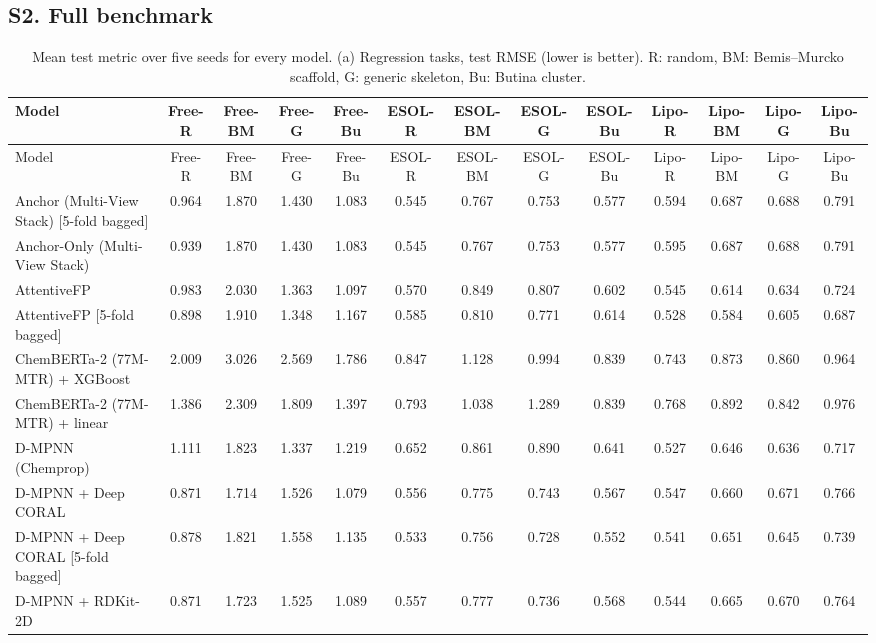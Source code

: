 \documentclass[11pt]{article}
\begin{document}
\begin{landscape}
\section*{S2. Full benchmark}{\scriptsize\setlength{\tabcolsep}{3pt}
\begin{longtable}{lcccccccccccc}
\caption{Mean test metric over five seeds for every model. (a) Regression tasks, test RMSE (lower is better). R: random, BM: Bemis--Murcko scaffold, G: generic skeleton, Bu: Butina cluster.}\\
\toprule
Model & Free-R & Free-BM & Free-G & Free-Bu & ESOL-R & ESOL-BM & ESOL-G & ESOL-Bu & Lipo-R & Lipo-BM & Lipo-G & Lipo-Bu \\
\midrule
\endfirsthead
\toprule
Model & Free-R & Free-BM & Free-G & Free-Bu & ESOL-R & ESOL-BM & ESOL-G & ESOL-Bu & Lipo-R & Lipo-BM & Lipo-G & Lipo-Bu \\
\midrule
\endhead
Anchor (Multi-View Stack) [5-fold bagged] & 0.964 & 1.870 & 1.430 & 1.083 & 0.545 & 0.767 & 0.753 & 0.577 & 0.594 & 0.687 & 0.688 & 0.791 \\
Anchor-Only (Multi-View Stack) & 0.939 & 1.870 & 1.430 & 1.083 & 0.545 & 0.767 & 0.753 & 0.577 & 0.595 & 0.687 & 0.688 & 0.791 \\
AttentiveFP & 0.983 & 2.030 & 1.363 & 1.097 & 0.570 & 0.849 & 0.807 & 0.602 & 0.545 & 0.614 & 0.634 & 0.724 \\
AttentiveFP [5-fold bagged] & 0.898 & 1.910 & 1.348 & 1.167 & 0.585 & 0.810 & 0.771 & 0.614 & 0.528 & 0.584 & 0.605 & 0.687 \\
ChemBERTa-2 (77M-MTR) + XGBoost & 2.009 & 3.026 & 2.569 & 1.786 & 0.847 & 1.128 & 0.994 & 0.839 & 0.743 & 0.873 & 0.860 & 0.964 \\
ChemBERTa-2 (77M-MTR) + linear & 1.386 & 2.309 & 1.809 & 1.397 & 0.793 & 1.038 & 1.289 & 0.839 & 0.768 & 0.892 & 0.842 & 0.976 \\
D-MPNN (Chemprop) & 1.111 & 1.823 & 1.337 & 1.219 & 0.652 & 0.861 & 0.890 & 0.641 & 0.527 & 0.646 & 0.636 & 0.717 \\
D-MPNN + Deep CORAL & 0.871 & 1.714 & 1.526 & 1.079 & 0.556 & 0.775 & 0.743 & 0.567 & 0.547 & 0.660 & 0.671 & 0.766 \\
D-MPNN + Deep CORAL [5-fold bagged] & 0.878 & 1.821 & 1.558 & 1.135 & 0.533 & 0.756 & 0.728 & 0.552 & 0.541 & 0.651 & 0.645 & 0.739 \\
D-MPNN + RDKit-2D & 0.871 & 1.723 & 1.525 & 1.089 & 0.557 & 0.777 & 0.736 & 0.568 & 0.544 & 0.665 & 0.670 & 0.764 \\

\end{longtable}}
\end{landscape}
\end{document}
